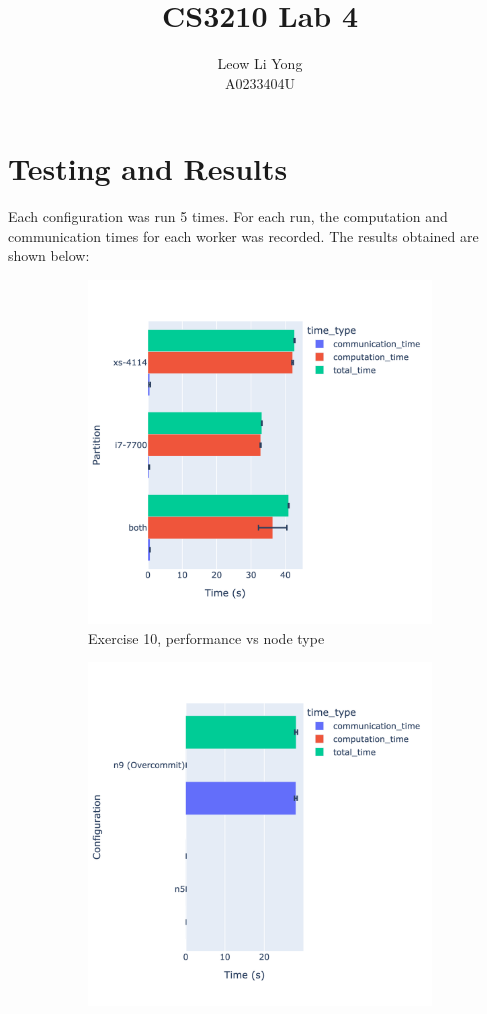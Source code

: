 \documentclass[11pt]{article}
\title{CS3210 Lab 4}
\author{Leow Li Yong \\ A0233404U}
\begin{document}
\section{Testing and Results}
Each configuration was run 5 times.
For each run, the computation and communication times for each worker was recorded.
The results obtained are shown below:
\begin{figure}[H]
  \centering
  \begin{subfigure}[t]{0.45\textwidth}
    \centering
    \includegraphics[width=\textwidth]{figures/main-1.png}
    \caption{Exercise 10, performance vs node type}
    \label{fig:main-1}
  \end{subfigure}
  \begin{subfigure}[t]{0.45\textwidth}
    \centering
    \includegraphics[width=\textwidth]{figures/main-2.png}

\end{subfigure}
\end{figure}
\end{document}
